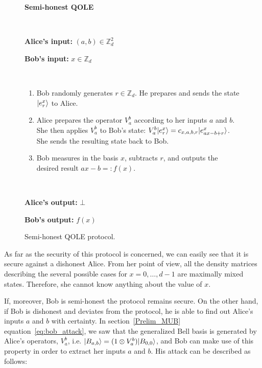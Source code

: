 \begin{figure}[h!]
    \centering
        \begin{tcolorbox}
            
            \centerline{\textbf{Semi-honest QOLE}}
            
            \
            
    		\textbf{Alice's input:} $(a, b) \in \mathbb{Z}^2_d$
    
    		\textbf{Bob's input:} $x \in\mathbb{Z}_d$
            
            \
            
		\begin{enumerate}
        \item Bob  randomly generates $r \in \mathbb{Z}_d$. He prepares and sends the state $| e^x_r \rangle$ to Alice.
        \item Alice prepares the operator $V^b_a$ according to her inputs $a$ and $b$. She then applies $V^b_a$ to Bob's state: $V^b_a | e^x_r \rangle = c_{x,a,b,r} | e^x_{ax - b + r} \rangle$. She sends the resulting state back to Bob. 
        \item Bob measures in the  basis  $x$,  subtracts $r$, and outputs the desired result $ax-b=:f(x)$.
    \end{enumerate}
    
    \
    
    \textbf{Alice's output:} $\bot$
    
    \textbf{Bob's output:} $f(x)$
        
        \end{tcolorbox}
    \caption{Semi-honest QOLE protocol.}
    \label{fig:SH_QOLE}
\end{figure}



As far as the security of this protocol is concerned, we can easily see that it is secure against a dishonest Alice.  From her point of view, all the density matrices describing the several possible cases for $x = 0, \ldots, d-1$  are maximally mixed states. Therefore, she cannot know anything about the value of $x$. 

If, moreover, Bob is semi-honest the protocol remains secure. On the other hand, if Bob is dishonest and deviates from the protocol, he is able to find out Alice's inputs $a$ and $b$ with certainty. %
In section~\ref{Prelim_MUB} equation~\eqref{eq:bob_attack}, we saw that the generalized Bell basis is generated by Alice's operators, $V^b_a$, i.e. $ | B_{a,b} \rangle = (1 \otimes V^b_a) | B_{0,0} \rangle $,  and Bob can make use of this property in order to extract her inputs $a$ and $b$. His attack can be described as follows:

